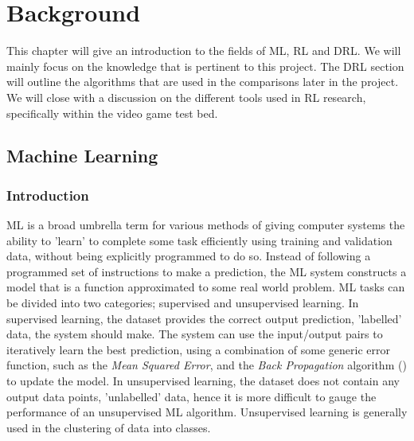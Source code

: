 \chapter{Background}
This chapter will give an introduction to the fields of ML, RL and DRL. We will mainly focus on the knowledge that is pertinent to this project. The DRL section will outline the algorithms that are used in the comparisons later in the project. We will close with a discussion on the different tools used in RL research, specifically within the video game test bed.

\section{Machine Learning}
\subsection{Introduction}
ML is a broad umbrella term for various methods of giving computer systems the ability to 'learn' to
complete some task efficiently using training and validation data, without being explicitly
programmed to do so. Instead of following a programmed set of instructions to make a prediction, the
ML system constructs a model that is a function approximated to some real world problem. ML tasks
can be divided into two categories; supervised and unsupervised learning. In supervised learning,
the dataset provides the correct output prediction, 'labelled' data, the system should make. The
system can use the input/output pairs to iteratively learn the best prediction, using a combination
of some generic error function, such as the \textit{Mean Squared Error}, and the \textit{Back Propagation} algorithm (\citet{chauvin-bp}) to update the model. In unsupervised learning, the dataset
does not contain any output data points, 'unlabelled' data, hence it is more difficult to gauge the
performance of an unsupervised ML algorithm. Unsupervised learning is generally used in the
clustering of data into classes. \paragraph{}

